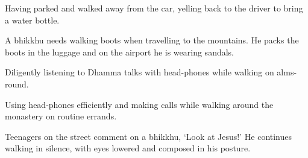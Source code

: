 \begin{exam}{\autoExamName}
\begin{problem*}
\begin{parts}
    \bigskip

    \item {} Having parked and walked away from the car, yelling back to the driver to bring a water bottle.

    \bigskip

    \item {} A bhikkhu needs walking boots when travelling to the mountains.
    He packs the boots in the luggage and on the airport he is wearing sandals.

    \bigskip

    \item {} Diligently listening to Dhamma talks with head-phones while
    walking on alms-round.

    \bigskip

    \item {} Using head-phones efficiently and making calls while walking
    around the monastery on routine errands.

    \bigskip

    \item {} Teenagers on the street comment on a bhikkhu, `Look at Jesus!'
    He continues walking in silence, with eyes lowered and composed in his
    posture.

    \end{parts}

  \end{problem*}

\end{exam}
